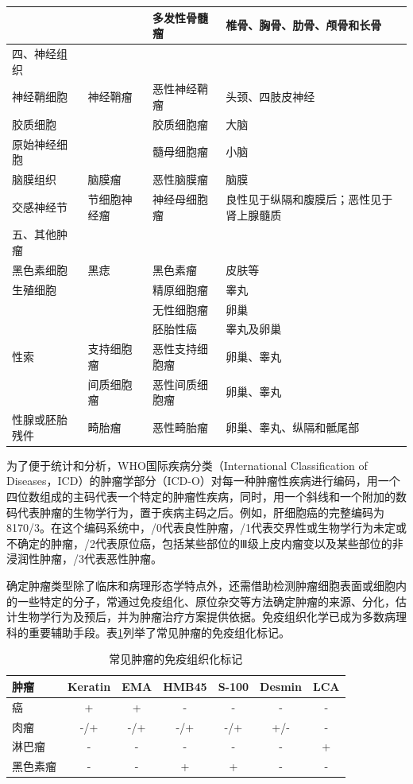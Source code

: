 \begin{longtable}[]{lm{3cm}m{3cm}m{3cm}}
&&多发性骨髓瘤&椎骨、胸骨、肋骨、颅骨和长骨
\\\hline
四、神经组织&&&
\\\hline
\quad 神经鞘细胞&神经鞘瘤&恶性神经鞘瘤&头颈、四肢皮神经
\\\hline
\quad 胶质细胞&&胶质细胞瘤&大脑
\\\hline
\quad 原始神经细胞&&髓母细胞瘤&小脑
\\\hline
\quad 脑膜组织&脑膜瘤&恶性脑膜瘤&脑膜
\\\hline
\quad 交感神经节&节细胞神经瘤&神经母细胞瘤&良性见于纵隔和腹膜后；恶性见于肾上腺髓质
\\\hline
五、其他肿瘤&&&
\\\hline
\quad 黑色素细胞&黑痣&黑色素瘤&皮肤等
\\\hline
\quad 生殖细胞&&精原细胞瘤&睾丸
\\\hline
&&无性细胞瘤&卵巢
\\\hline
&&胚胎性癌&睾丸及卵巢
\\\hline
\quad 性索&支持细胞瘤&恶性支持细胞瘤&卵巢、睾丸
\\\hline
&间质细胞瘤&恶性间质细胞瘤&卵巢、睾丸
\\\hline
\quad 性腺或胚胎残件&畸胎瘤&恶性畸胎瘤&卵巢、睾丸、纵隔和骶尾部
\\
\bottomrule
\end{longtable}


为了便于统计和分析，WHO国际疾病分类（International Classification of
Diseases，ICD）的肿瘤学部分（ICD-O）对每一种肿瘤性疾病进行编码，用一个四位数组成的主码代表一个特定的肿瘤性疾病，同时，用一个斜线和一个附加的数码代表肿瘤的生物学行为，置于疾病主码之后。例如，肝细胞癌的完整编码为8170/3。在这个编码系统中，/0代表良性肿瘤，/1代表交界性或生物学行为未定或不确定的肿瘤，/2代表原位癌，包括某些部位的Ⅲ级上皮内瘤变以及某些部位的非浸润性肿瘤，/3代表恶性肿瘤。

确定肿瘤类型除了临床和病理形态学特点外，还需借助检测肿瘤细胞表面或细胞内的一些特定的分子，常通过免疫组化、原位杂交等方法确定肿瘤的来源、分化，估计生物学行为及预后，并为肿瘤治疗方案提供依据。免疫组织化学已成为多数病理科的重要辅助手段。表\ref{tab5-2}列举了常见肿瘤的免疫组化标记。

\begin{table}[ht]
    \caption{常见肿瘤的免疫组织化标记}
    \label{tab5-2}
    \centering
    \begin{tabular}{lcccccc}
    \toprule
    肿瘤 & Keratin & EMA & HMB45 & S-100 & Desmin & LCA\\
    \midrule
    癌 & + & + & - & -&-&-\\
    肉瘤&-/+&-/+&-/+&-/+&+/-&-\\
    淋巴瘤&-&-&-&-&-&+\\
    黑色素瘤&-&-&+&+&-&-\\
    \bottomrule
    \end{tabular}
  \end{table}

